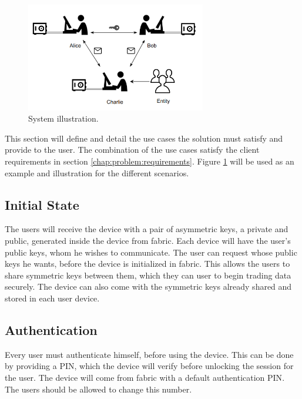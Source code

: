 \begin{figure}[h]
    \centering
    \includegraphics[width=0.7\textwidth]{./Images/main-figure.png}
    \caption{System illustration.}
    \label{fig:main-system}
\end{figure}

This section will define and detail the use cases the solution must satisfy and provide to the user. The combination of the use cases satisfy the client requirements in section \ref{chap:problem:requirements}.
Figure \ref{fig:main-system} will be used as an example and illustration for the different scenarios.

\subsection{Initial State}\label{chap:problem:scenarios:init}

The users will receive the device with a pair of asymmetric keys, a private and public, generated inside the device from fabric.
Each device will have the user's public keys, whom he wishes to communicate.
The user can request whose public keys he wants, before the device is initialized in fabric.
This allows the users to share symmetric keys between them, which they can user to begin trading data securely.
The device can also come with the symmetric keys already shared and stored in each user device.

\subsection{Authentication}\label{chap:problem:scenarios:auth}

Every user must authenticate himself, before using the device. This can be done by providing a \ac{PIN}, which the device will verify before unlocking the session for the user.
The device will come from fabric with a default authentication \ac{PIN}. The users should be allowed to change this number.

